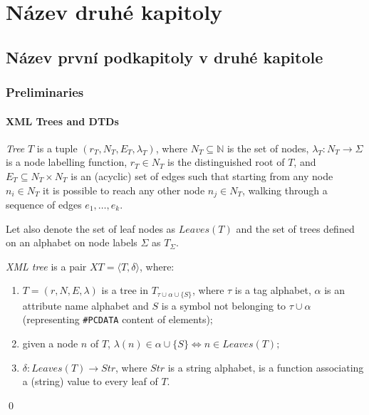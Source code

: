 \chapter{Název druhé kapitoly}

\section{Název první podkapitoly v druhé kapitole}

\subsection{Preliminaries}

\subsubsection{XML Trees and DTDs}
\begin{define}[Tree]
{\sl Tree} $T$ is a tuple $(r_T, N_T, E_T, \lambda_T)$, where $N_T \subseteq \mathbb{N}$ is the set of nodes, $\lambda_T : N_T \to \Sigma$ is a node labelling function, $r_T \in N_T$ is the distinguished root of $T$, and $E_T \subseteq N_T \times N_T$ is an (acyclic) set of edges such that starting from any node $n_i \in N_T$ it is possible to reach any other node $n_j \in N_T$, walking through a sequence of edges $e_1,\dots,e_k$.
\end{define}

\noindent Let also denote the set of leaf nodes as $Leaves(T)$ and the set of trees defined on an alphabet on node labels $\Sigma$ as $T_\Sigma$.

\begin{define}
{\sl XML tree} is a pair $XT=\langle T,\delta \rangle$, where:
	\begin{enumerate}
		\item $T = (r, N, E, \lambda)$ is a tree in $T_{\tau\cup\alpha\cup\{S\}}$, where $\tau$ is a tag alphabet, $\alpha$ is an attribute name alphabet and $S$ is a symbol not belonging to $\tau\cup\alpha$ (representing \texttt{\#PCDATA} content of elements)$;$
		\item given a node $n$ of $T$, $\lambda(n) \in \alpha \cup \{S\} \Leftrightarrow n \in Leaves(T);$
		\item $\delta : Leaves(T) \rightarrow Str$, where $Str$ is a string alphabet, is a function associating a (string) value to every leaf of $T$.
	\end{enumerate}\qed
\end{define}

